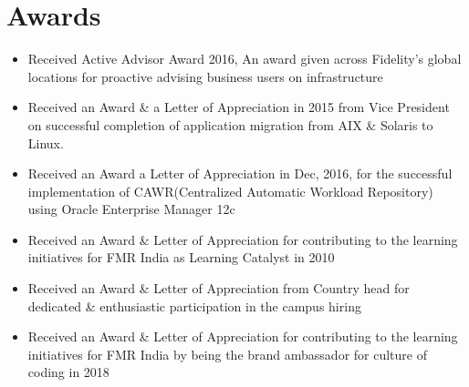 \documentclass[letterpaper,11pt]{article}
\begin{document}
\section{Awards}
\begin{itemize}\setlength{\itemsep}{0pt}
\item Received Active Advisor Award 2016, An award given across Fidelity's global locations for proactive advising business users on infrastructure 
\item Received an Award \& a Letter of Appreciation in 2015 from Vice President on successful completion of application migration from AIX \& Solaris to Linux.
\item \begin{justify}Received an Award a Letter of Appreciation in Dec, 2016, for the successful implementation of CAWR(Centralized Automatic Workload Repository) using Oracle Enterprise Manager 12c\end{justify}
\item Received an Award \& Letter of Appreciation for contributing to the learning initiatives for FMR India as Learning Catalyst in 2010
\item Received an Award \& Letter of Appreciation from Country head for dedicated \&
enthusiastic participation in the campus hiring
\item Received an Award \& Letter of Appreciation for contributing to the learning initiatives for FMR India by being the brand ambassador for culture of coding in 2018
\end{itemize}
\end{document}
